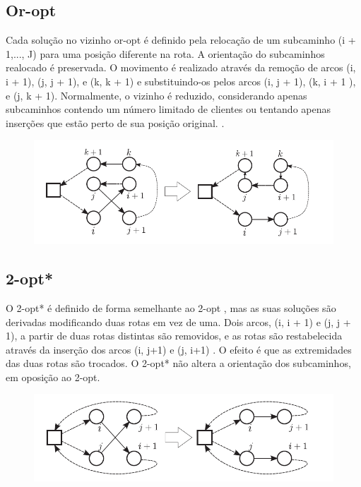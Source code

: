 \subsection{Or-opt}

 Cada solução no vizinho or-opt é definido pela relocação de um subcaminho (i + 1,..., J) para uma posição diferente na rota. A orientação do subcaminhos realocado é preservada. O movimento é realizado através da remoção de arcos (i, i + 1), (j, j + 1), e (k, k + 1) e substituindo-os pelos arcos (i, j + 1), (k, i + 1 ), e (j, k + 1). Normalmente, o vizinho é reduzido, considerando apenas subcaminhos contendo um número limitado de clientes ou tentando apenas inserções que estão perto de sua posição original. \cite{braysy05}. 

\begin{figure}[ht!]
\centering
\includegraphics[scale=0.8]{figuras/opt-2.PNG}
\label{opt-2}
\end{figure}

\subsection{2-opt*}

 O 2-opt* é definido de forma semelhante ao 2-opt , mas as suas soluções são derivadas modificando duas rotas em vez de uma. Dois arcos, (i, i + 1) e (j, j + 1), a partir de duas rotas distintas são removidos, e as rotas são restabelecida através da inserção dos arcos (i, j+1) e (j, i+1) . O efeito é que as extremidades das duas rotas são trocados. O 2-opt* não altera a orientação dos subcaminhos, em oposição ao 2-opt.

\begin{figure}[ht!]
\centering
\includegraphics[scale=0.8]{figuras/opt-3.PNG}
\label{opt-3}
\end{figure}

